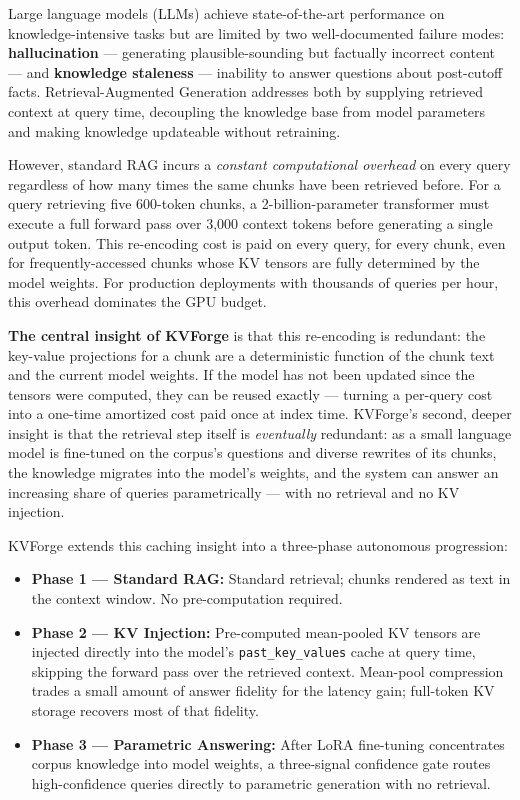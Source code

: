 \documentclass[10pt,twocolumn]{article}
\begin{document}
Large language models (LLMs) achieve state-of-the-art performance on knowledge-intensive tasks but are limited by two well-documented failure modes: \textbf{hallucination} --- generating plausible-sounding but factually incorrect content --- and \textbf{knowledge staleness} --- inability to answer questions about post-cutoff facts. Retrieval-Augmented Generation \cite{ref1} addresses both by supplying retrieved context at query time, decoupling the knowledge base from model parameters and making knowledge updateable without retraining.


However, standard RAG incurs a \textit{constant computational overhead} on every query regardless of how many times the same chunks have been retrieved before. For a query retrieving five 600-token chunks, a 2-billion-parameter transformer must execute a full forward pass over 3,000 context tokens before generating a single output token. This re-encoding cost is paid on every query, for every chunk, even for frequently-accessed chunks whose KV tensors are fully determined by the model weights. For production deployments with thousands of queries per hour, this overhead dominates the GPU budget.


\textbf{The central insight of KVForge} is that this re-encoding is redundant: the key-value projections for a chunk are a deterministic function of the chunk text and the current model weights. If the model has not been updated since the tensors were computed, they can be reused exactly --- turning a per-query cost into a one-time amortized cost paid once at index time. KVForge's second, deeper insight is that the retrieval step itself is \textit{eventually} redundant: as a small language model is fine-tuned on the corpus's questions and diverse rewrites of its chunks, the knowledge migrates into the model's weights, and the system can answer an increasing share of queries parametrically --- with no retrieval and no KV injection.


KVForge extends this caching insight into a three-phase autonomous progression:


\begin{itemize}
  \item \textbf{Phase 1 --- Standard RAG:} Standard retrieval; chunks rendered as text in the context window. No pre-computation required.
  \item \textbf{Phase 2 --- KV Injection:} Pre-computed mean-pooled KV tensors are injected directly into the model's \texttt{past\_key\_values} cache at query time, skipping the forward pass over the retrieved context. Mean-pool compression trades a small amount of answer fidelity for the latency gain; full-token KV storage recovers most of that fidelity.
  \item \textbf{Phase 3 --- Parametric Answering:} After LoRA fine-tuning concentrates corpus knowledge into model weights, a three-signal confidence gate routes high-confidence queries directly to parametric generation with no retrieval.
\end{itemize}
\end{document}
